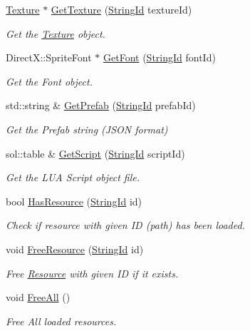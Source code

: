 \begin{DoxyCompactItemize}
\hyperlink{classTexture}{Texture} $\ast$ \hyperlink{classResourceManager_a9bb5a0470852ea85f850a27b8d9133ff}{Get\+Texture} (\hyperlink{classStringId}{String\+Id} texture\+Id)
\begin{DoxyCompactList}\small\item\em Get the \hyperlink{classTexture}{Texture} object. \end{DoxyCompactList}\item 
Direct\+X\+::\+Sprite\+Font $\ast$ \hyperlink{classResourceManager_aad095f65eef966135684e8c6fcba76a6}{Get\+Font} (\hyperlink{classStringId}{String\+Id} font\+Id)
\begin{DoxyCompactList}\small\item\em Get the Font object. \end{DoxyCompactList}\item 
std\+::string \& \hyperlink{classResourceManager_aade11c5b0af3ecac56f4629c9f07683d}{Get\+Prefab} (\hyperlink{classStringId}{String\+Id} prefab\+Id)
\begin{DoxyCompactList}\small\item\em Get the Prefab string (J\+S\+ON format) \end{DoxyCompactList}\item 
sol\+::table \& \hyperlink{classResourceManager_ad38f74c18fb1f4750f207ca19da3de33}{Get\+Script} (\hyperlink{classStringId}{String\+Id} script\+Id)
\begin{DoxyCompactList}\small\item\em Get the L\+UA Script object file. \end{DoxyCompactList}\item 
bool \hyperlink{classResourceManager_a33f26119999ed39ec307628b5205c727}{Has\+Resource} (\hyperlink{classStringId}{String\+Id} id)
\begin{DoxyCompactList}\small\item\em Check if resource with given ID (path) has been loaded. \end{DoxyCompactList}\item 
void \hyperlink{classResourceManager_a092d1668208e605a7aed842ca2c53f27}{Free\+Resource} (\hyperlink{classStringId}{String\+Id} id)
\begin{DoxyCompactList}\small\item\em Free \hyperlink{structResource}{Resource} with given ID if it exists. \end{DoxyCompactList}\item 
\mbox{\label{classResourceManager_a0a768cd3e8c06ae3d509a52f13108111}} 
void \hyperlink{classResourceManager_a0a768cd3e8c06ae3d509a52f13108111}{Free\+All} ()
\begin{DoxyCompactList}\small\item\em Free All loaded resources. \end{DoxyCompactList}\end{DoxyCompactItemize}

